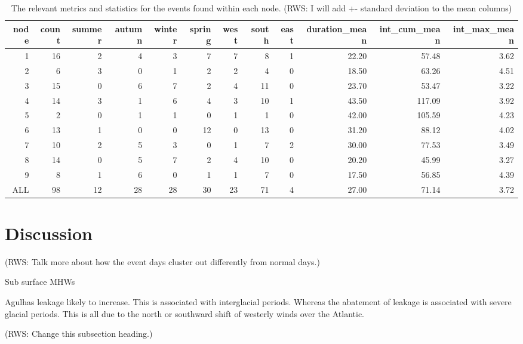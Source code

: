 \documentclass[a4paper,10pt,review]{elsarticle}
\begin{document}
\begin{table}[ht]
\caption{\small The relevant metrics and statistics for the events found within each node. (RWS: I will add +- standard deviation to the mean columns)}
\label{table2}
\centering
\tiny
\begin{tabular}{rrrrrrrrrrrr}
  \toprule
node & count & summer & autumn & winter & spring & west & south & east & duration\_mean & int\_cum\_mean & int\_max\_mean \\ 
  \midrule
1 &  16 &   2 &   4 &   3 &   7 &   7 &   8 &   1 & 22.20 & 57.48 & 3.62 \\ 
  2 &   6 &   3 &   0 &   1 &   2 &   2 &   4 &   0 & 18.50 & 63.26 & 4.51 \\ 
  3 &  15 &   0 &   6 &   7 &   2 &   4 &  11 &   0 & 23.70 & 53.47 & 3.22 \\ 
  4 &  14 &   3 &   1 &   6 &   4 &   3 &  10 &   1 & 43.50 & 117.09 & 3.92 \\ 
  5 &   2 &   0 &   1 &   1 &   0 &   1 &   1 &   0 & 42.00 & 105.59 & 4.23 \\ 
  6 &  13 &   1 &   0 &   0 &  12 &   0 &  13 &   0 & 31.20 & 88.12 & 4.02 \\ 
  7 &  10 &   2 &   5 &   3 &   0 &   1 &   7 &   2 & 30.00 & 77.53 & 3.49 \\ 
  8 &  14 &   0 &   5 &   7 &   2 &   4 &  10 &   0 & 20.20 & 45.99 & 3.27 \\ 
  9 &   8 &   1 &   6 &   0 &   1 &   1 &   7 &   0 & 17.50 & 56.85 & 4.39 \\ 
  ALL &  98 &  12 &  28 &  28 &  30 &  23 &  71 &   4 & 27.00 & 71.14 & 3.72 \\ 
  \bottomrule
  \end{tabular}
\end{table}

\section{Discussion}
(RWS: Talk more about how the event days cluster out differently from normal days.)

\citet{Schaeffer2017} Sub surface MHWs

\citet{Beal2011} Agulhas leakage likely to increase. This is associated with interglacial periods. Whereas the abatement of leakage is associated with severe glacial periods. This is all due to the north or southward shift of westerly winds over the Atlantic.

(RWS: Change this subsection heading.)
\end{document}

